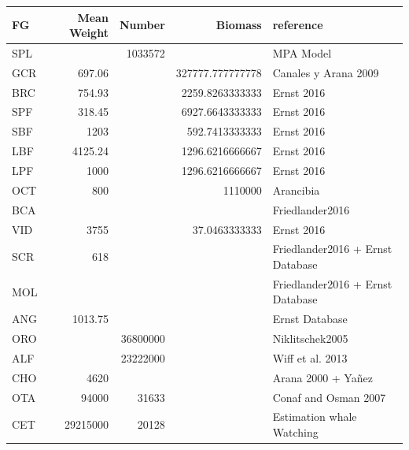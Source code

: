 \documentclass[11pt]{article}
\begin{document}
\begin{itemize}
\begin{itemize}
\begin{center}
\begin{tabular}{lrrrl}
 FG   &  Mean Weight  &    Number  &           Biomass  &  reference                         \\
\hline
 SPL  &               &   1033572  &                    &  MPA Model                         \\
 GCR  &       697.06  &            &  327777.777777778  &  Canales y Arana 2009              \\
 BRC  &       754.93  &            &   2259.8263333333  &  Ernst 2016                        \\
 SPF  &       318.45  &            &   6927.6643333333  &  Ernst 2016                        \\
 SBF  &         1203  &            &    592.7413333333  &  Ernst 2016                        \\
 LBF  &      4125.24  &            &   1296.6216666667  &  Ernst 2016                        \\
 LPF  &         1000  &            &   1296.6216666667  &  Ernst 2016                        \\
 OCT  &          800  &            &           1110000  &  Arancibia                         \\
 BCA  &               &            &                    &  Friedlander2016                   \\
 VID  &         3755  &            &     37.0463333333  &  Ernst 2016                        \\
 SCR  &          618  &            &                    &  Friedlander2016 + Ernst Database  \\
 MOL  &               &            &                    &  Friedlander2016 + Ernst Database  \\
 ANG  &      1013.75  &            &                    &  Ernst Database                    \\
 ORO  &               &  36800000  &                    &  Niklitschek2005                   \\
 ALF  &               &  23222000  &                    &  Wiff et al. 2013                  \\
 CHO  &         4620  &            &                    &  Arana 2000 + Yañez                \\
 OTA  &        94000  &     31633  &                    &  Conaf and Osman 2007              \\
 CET  &     29215000  &     20128  &                    &  Estimation whale Watching         \\

\end{tabular}
\end{center}
\end{itemize}
\end{itemize}
\end{document}
